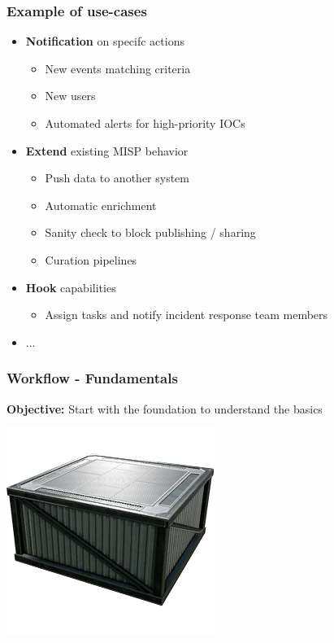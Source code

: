
\begin{frame}[t,plain]
\titlepage
\end{frame}

\begin{frame}
    \frametitle{Example of use-cases}
    \begin{itemize}
        \item \textbf{Notification} on specifc actions
        \begin{itemize}
            \item New events matching criteria
            \item New users
            \item Automated alerts for high-priority IOCs
        \end{itemize}
        \item \textbf{Extend} existing MISP behavior
        \begin{itemize}
            \item Push data to another system
            \item Automatic enrichment
            \item Sanity check to block publishing / sharing
            \item Curation pipelines
        \end{itemize}
        \item \textbf{Hook} capabilities
        \begin{itemize}
            \item Assign tasks and notify incident response team members
        \end{itemize}
        \item ...
    \end{itemize}
\end{frame}

\begin{frame}
    \frametitle{
        \huge
        Workflow - Fundamentals
        \vspace{1em}
    }
    \textbf{Objective:} Start with the foundation to understand the basics
    \begin{center}
        \includegraphics[width=0.07\linewidth]{pictures/fundation}
    \end{center}
\end{frame}

